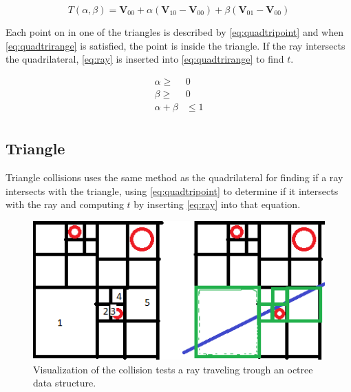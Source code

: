 \documentclass[a4paper, 12pt]{report}
\begin{document}
\begin{equation}
\label{eq:quadtripoint}
T(\alpha, \beta) = \mathbf{V}_{00} + \alpha ( \mathbf{V}_{10} - \mathbf{V}_{00}) + \beta (\mathbf{V}_{01} - \mathbf{V}_{00})
\end{equation}

Each point on in one of the triangles is described by \autoref{eq:quadtripoint} and when \autoref{eq:quadtrirange} is satisfied, the point is inside the triangle.
If the ray intersects the quadrilateral, \autoref{eq:ray} is inserted into \autoref{eq:quadtrirange} to find $t$.

\begin{subequations} \label{eq:quadtrirange}
\begin{align}
\alpha \ge& 0\\
\beta \ge& 0\\
\alpha + \beta& \le 1\\
\end{align}
\end{subequations}

\subsection{Triangle}
Triangle collisions uses the same method as the quadrilateral for finding if a ray intersects with the triangle, using \autoref{eq:quadtripoint} to determine if it intersects with the ray and computing $t$ by inserting \autoref{eq:ray} into that equation.


\begin{figure}
	\centering
	\includegraphics[width=\textwidth]{figures/octreetwod.png}
	\caption{Visualization of the collision tests a ray traveling trough an octree data structure.}
	\label{fig:octreetraversal}
\end{figure}
\end{document}
